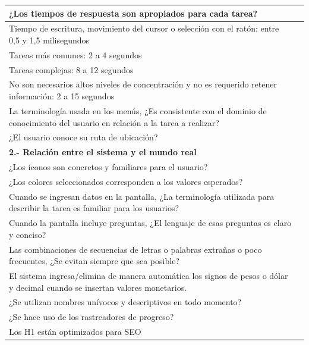 \documentclass[stu, 12pt, letterpaper, donotrepeattitle, floatsintext, natbib]{apa7}
\begin{document}
\begin{longtable}{|>{\raggedright\arraybackslash}p{10cm}|>{\centering\arraybackslash}p{3cm}|}
    ¿Los tiempos de respuesta son apropiados para cada tarea? & \\ \hline
    Tiempo de escritura, movimiento del cursor o selección con el ratón: entre 0,5 y 1,5 milisegundos & \\ \hline
    Tareas más comunes: 2 a 4 segundos & \\ \hline
    Tareas complejas: 8 a 12 segundos & \\ \hline
    No son necesarios altos niveles de concentración y no es requerido retener información: 2 a 15 segundos & \\ \hline
    La terminología usada en los menús, ¿Es consistente con el dominio de conocimiento del usuario en relación a la tarea a realizar? & \\ \hline
    ¿El usuario conoce su ruta de ubicación? & \\ \hline
    
    \textbf{2.- Relación entre el sistema y el mundo real} & \\ \hline
    ¿Los íconos son concretos y familiares para el usuario? & \\ \hline
    ¿Los colores seleccionados corresponden a los valores esperados? & \\ \hline
    Cuando se ingresan datos en la pantalla, ¿La terminología utilizada para describir la tarea es familiar para los usuarios? & \\ \hline
    Cuando la pantalla incluye preguntas, ¿El lenguaje de esas preguntas es claro y conciso? & \\ \hline
    Las combinaciones de secuencias de letras o palabras extrañas o poco frecuentes, ¿Se evitan siempre que sea posible? & \\ \hline
    El sistema ingresa/elimina de manera automática los signos de pesos o dólar y decimal cuando se insertan valores monetarios. & \\ \hline
    ¿Se utilizan nombres unívocos y descriptivos en todo momento? & \\ \hline
    ¿Se hace uso de los rastreadores de progreso? & \\ \hline
    Los H1 están optimizados para SEO & \\ \hline
    

\end{longtable}
\end{document}
